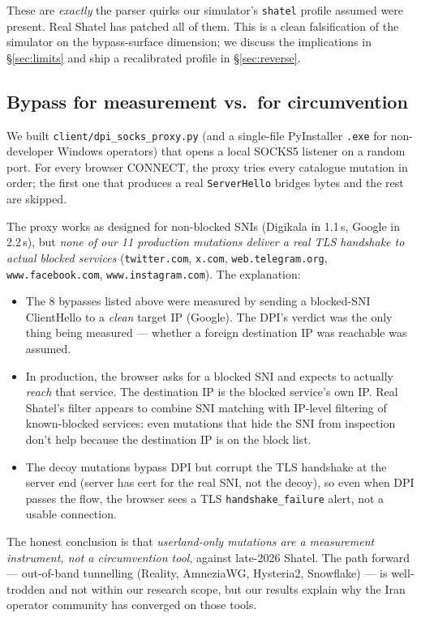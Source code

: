 \documentclass[letterpaper,twocolumn,10pt]{article}
\begin{document}
These are \emph{exactly} the parser quirks our simulator's
\texttt{shatel} profile assumed were present. Real Shatel has
patched all of them. This is a clean falsification of the simulator
on the bypass-surface dimension; we discuss the implications in
§\ref{sec:limits} and ship a recalibrated profile in
§\ref{sec:reverse}.

\subsection{Bypass for measurement vs.\ for circumvention}

We built \texttt{client/dpi\_socks\_proxy.py} (and a single-file
PyInstaller \texttt{.exe} for non-developer Windows operators)
that opens a local SOCKS5 listener on a random port. For every
browser CONNECT, the proxy tries every catalogue mutation in order;
the first one that produces a real \texttt{ServerHello} bridges
bytes and the rest are skipped.

The proxy works as designed for non-blocked SNIs (Digikala in 1.1\,s,
Google in 2.2\,s), but \emph{none of our 11 production mutations
deliver a real TLS handshake to actual blocked services}
(\texttt{twitter.com}, \texttt{x.com}, \texttt{web.telegram.org},
\texttt{www.facebook.com}, \texttt{www.instagram.com}). The
explanation:

\begin{itemize}
    \item The 8 bypasses listed above were measured by sending a
    blocked-SNI ClientHello to a \emph{clean} target IP (Google).
    The DPI's verdict was the only thing being measured — whether a
    foreign destination IP was reachable was assumed.
    \item In production, the browser asks for a blocked SNI and
    expects to actually \emph{reach} that service. The destination
    IP is the blocked service's own IP. Real Shatel's filter
    appears to combine SNI matching with IP-level filtering of
    known-blocked services: even mutations that hide the SNI from
    inspection don't help because the destination IP is on the
    block list.
    \item The decoy mutations bypass DPI but corrupt the TLS
    handshake at the server end (server has cert for the real SNI,
    not the decoy), so even when DPI passes the flow, the browser
    sees a TLS \texttt{handshake\_failure} alert, not a usable
    connection.
\end{itemize}

The honest conclusion is that \emph{userland-only mutations are a
measurement instrument, not a circumvention tool}, against
late-2026 Shatel. The path forward — out-of-band tunnelling
(Reality, AmneziaWG, Hysteria2, Snowflake) — is well-trodden and
not within our research scope, but our results explain why the Iran
operator community has converged on those tools.
\end{document}
